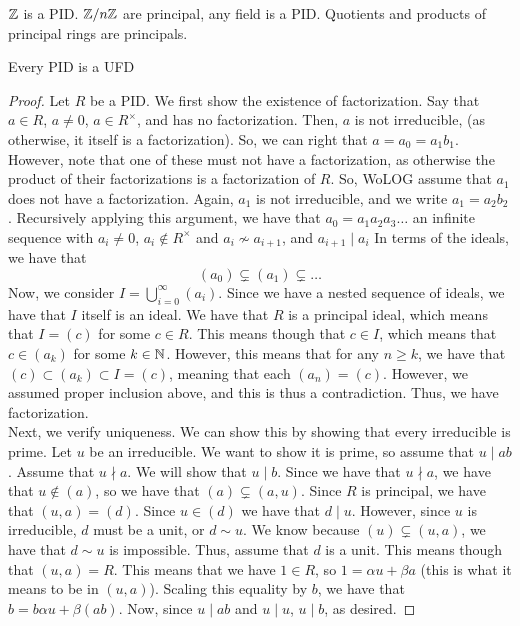 \begin{ex}
    $\mathbb{Z}$ is a PID. $\mathbb{Z} / n \mathbb{Z}$ are principal, any field is a PID. Quotients and products
    of principal rings are principals.
\end{ex}
\begin{thm}
    Every PID is a UFD
\end{thm}
\begin{proof}
    Let $R$ be a PID. We first show the existence of factorization. Say that
    $a \in R$, $a \neq 0$, $a \in R^\times$, and has no factorization. Then,
    $a$ is not irreducible, (as otherwise, it itself is a factorization). So,
    we can right that $a = a_0 = a_1b_1$. However, note that one of these must
    not have a factorization, as otherwise the product of their factorizations
    is a factorization of $R$. So, WoLOG assume that $a_1$ does not have a factorization.
    Again, $a_1$ is not irreducible, and we write $a_1 = a_2b_2$. Recursively
    applying this argument, we have that $a_0 = a_1a_2a_3 \dots$ an infinite sequence with
    $a_i \neq 0$, $a_i \notin R^\times$ and $a_i \not\sim a_{i+1}$, and $a_{i+1} \mid a_{i}$
    In terms of the ideals, we have that
    $$
    (a_0) \subsetneq (a_1) \subsetneq \dots
    $$
    Now, we consider $I = \bigcup\limits_{i=0}^{\infty}{(a_i)}$. Since we have a
    nested sequence of ideals, we have that $I$ itself is an ideal. We have that $R$
    is a principal ideal, which means that $I = (c)$ for some $c \in R$. This means
    though that $c \in I$, which means that $c \in (a_k)$ for some $k \in \mathbb{N}$.
    However, this means that for any $n \geq k$, we have that $(c) \subset (a_k) \subset I = (c)$,
    meaning that each $(a_n) = (c)$. However, we assumed proper inclusion above,
    and this is thus a contradiction. Thus, we have factorization. \\
    Next, we verify uniqueness. We can show this by showing that every irreducible is
    prime. Let $u$ be an irreducible. We want to show it is prime, so assume that $u \mid ab$.
    Assume that $u \nmid a$. We will show that $u \mid b$. Since we have that $u \nmid a$,
    we have that $u \notin (a)$, so we have that $(a) \subsetneq (a, u)$. Since
    $R$ is principal, we have that $(u, a) = (d)$. Since $u \in (d)$ we have that $d \mid u$.
    However, since $u$ is irreducible, $d$ must be a unit, or $d \sim u$. We know because
    $(u) \subsetneq (u,a)$, we have that $d \sim u$ is impossible. Thus, assume that
    $d$ is a unit. This means though that $(u,a)  = R$. This means that we have $1 \in R$,
    so $1 = \alpha u + \beta a$ (this is what it means to be in $(u,a)$). Scaling
    this equality by $b$, we have that $b = b\alpha u + \beta (ab)$. Now, since $u \mid ab$
    and $u \mid u$, $u \mid b$, as desired.
\end{proof}
